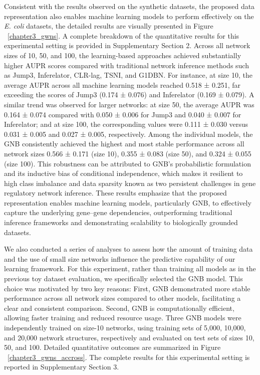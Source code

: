 Consistent with the results observed on the synthetic datasets, the proposed data representation also enables machine learning models to perform effectively on the \textit{E. coli} datasets, the detailed results are visually presented in Figure ~\ref{chapter3_gwns}. A complete breakdown of the quantitative results for this experimental setting is provided in Supplementary Section 2. Across all network sizes of 10, 50, and 100, the learning-based approaches achieved substantially higher AUPR scores compared with traditional network inference methods such as Jump3, Inferelator, CLR-lag, TSNI, and G1DBN. For instance, at size 10, the average AUPR across all machine learning models reached 0.518 ± 0.251, far exceeding the scores of Jump3 (0.174 ± 0.076) and Inferelator (0.169 ± 0.079). A similar trend was observed for larger networks: at size 50, the average AUPR was 0.164 ± 0.074 compared with 0.050 ± 0.006 for Jump3 and 0.040 ± 0.007 for Inferelator; and at size 100, the corresponding values were 0.111 ± 0.030 versus 0.031 ± 0.005 and 0.027 ± 0.005, respectively. Among the individual models, the GNB consistently achieved the highest and most stable performance across all network sizes 0.566 ± 0.171 (size 10), 0.355 ± 0.083 (size 50), and 0.324 ± 0.055 (size 100). This robustness can be attributed to GNB’s probabilistic formulation and its inductive bias of conditional independence, which makes it resilient to high class imbalance and data sparsity known as two persistent challenges in gene regulatory network inference. These results emphasize that the proposed representation enables machine learning models, particularly GNB, to effectively capture the underlying gene–gene dependencies, outperforming traditional inference frameworks and demonstrating scalability to biologically grounded datasets.\par

We also conducted a series of analyses to assess how the amount of training data and the use of small size networks influence the predictive capability of our learning framework. For this experiment, rather than training all models as in the previous toy dataset evaluation, we specifically selected the GNB model. This choice was motivated by two key reasons: First, GNB demonstrated more stable performance across all network sizes compared to other models, facilitating a clear and consistent comparison. Second, GNB is computationally efficient, allowing faster training and reduced resource usage. Three GNB models were independently trained on size-10 networks, using training sets of 5,000, 10,000, and 20,000 network structures, respectively and evaluated on test sets of sizes 10, 50, and 100. Detailed quantitative outcomes are summarized in Figure ~\ref{chapter3_gwns_accross}. The complete results for this experimental setting is reported in Supplementary Section 3.


